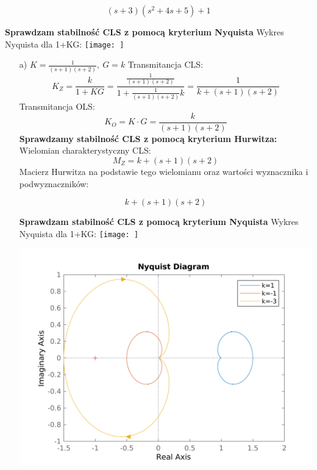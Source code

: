 \documentclass{article}
\begin{document}
$$\left(s + 3\right) \left(s^{2} + 4 s + 5\right) + 1$$

\newline\textbf{Sprawdzam stabilność CLS z pomocą kryterium Nyquista}\newline
Wykres Nyquista dla 1+KG:
\texttt{[image: ]}
\newpage
\begin{itemize}
    
    \item[a)] $K=\frac{1}{\left(s + 1\right) \left(s + 2\right)}, \ G=k$
    Transmitancja CLS:
    $$K_Z=\frac{k}{1+KG}=\frac{\frac{1}{\left(s + 1\right) \left(s + 2\right)}}{1+\frac{1}{\left(s + 1\right) \left(s + 2\right)}k}=\frac{1}{k + \left(s + 1\right) \left(s + 2\right)}$$
    Transmitancja OLS:
    $$K_O=K\cdot G=\frac{k}{\left(s + 1\right) \left(s + 2\right)}$$
    \textbf{Sprawdzamy stabilność CLS z pomocą kryterium Hurwitza:}\newline
    Wielomian charakterystyczny CLS:
    $$M_Z=k + \left(s + 1\right) \left(s + 2\right)$$
    Macierz Hurwitza na podstawie tego wielomianu oraz wartości wyznacznika i podwyznaczników:
    
    $$k + \left(s + 1\right) \left(s + 2\right)$$
    
    \newline\textbf{Sprawdzam stabilność CLS z pomocą kryterium Nyquista}\newline
    Wykres Nyquista dla 1+KG:
    \texttt{[image: ]}
    \newpage
    
        \includegraphics[scale=0.8]{a.png}
        \newpage            
    

\end{itemize}
\end{document}
